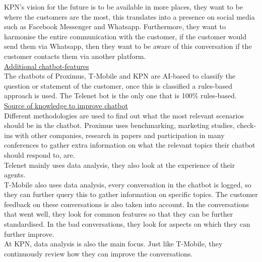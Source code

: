 \break
KPN's vision for the future is to be available in more places, they want to be where the customers are the most, this translates into a presence on social media such as Facebook Messenger and Whatsapp. Furthermore, they want to harmonise the entire communication with the customer, if the customer would send them via Whatsapp, then they want to be aware of this conversation if the customer contacts them via another platform.\\
\break
\ul{Additional chatbot-features}\\
The chatbots of Proximus, T-Mobile and KPN are AI-based to classify the question or statement of the customer, once this is classified a rules-based approach is used. The Telenet bot is the only one that is 100\% rules-based.\\
\break
\ul{Source of knowledge to improve chatbot}\\
Different methodologies are used to find out what the most relevant scenarios should be in the chatbot. Proximus uses benchmarking, marketing studies, check-ins with other companies, research in papers and participation in many conferences to gather extra information on what the relevant topics their chatbot should respond to, are.\\
\break
Telenet mainly uses data analysis, they also look at the experience of their agents.\\
\break
T-Mobile also uses data analysis, every conversation in the chatbot is logged, so they can further query this to gather information on specific topics. The customer feedback on these conversations is also taken into account. In the conversations that went well, they look for common features so that they can be further standardised. In the bad conversations, they look for aspects on which they can further improve.\\
\break
At KPN, data analysis is also the main focus. Just like T-Mobile, they continuously review how they can improve the conversations.\\
\break
